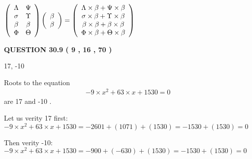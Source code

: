 \documentclass[12pt]{article}
\begin{document}
$  %
 \left( \begin{array}
 {
 c
 c
 }
 \Lambda & 
 \Psi \\ 
 \sigma & 
 \Upsilon \\ 
 \beta & 
 \beta \\ 
 \Phi & 
 \Theta
 \end{array} \right)
 \left( \begin{array}
 {
 c
 }
 \beta \\ 
 \beta
 \end{array} \right)
=
 \left( \begin{array}
 {
 c
 }
  \Lambda \times  \beta +  \Psi \times  \beta \\ 
  \sigma \times  \beta +  \Upsilon \times  \beta \\ 
  \beta \times  \beta +  \beta \times  \beta \\ 
  \Phi \times  \beta +  \Theta \times  \beta
 \end{array} \right)
$
 
 
 
 
 
\noindent{}

 
 
  
\vspace{0.2in}
  
{\textbf{\Large{QUESTION
30.9 
 (           9 ,          16 ,          70 )
}}}
  
  


 
 
\noindent{}

17,  %
-10
 
 
 
 
 
\noindent{}

Roots to the equation
\begin{eqnarray*}
-9 \times x^2  %
+  %
63
                 \times x    %
+  %
1530 =0
\end{eqnarray*}
are  %
17 and  %
-10 .
 
Let us verity  %
17 first:
$  %
-9 \times x^2  %
+  %
63
                 \times x    %
+  %
1530
  = %
-2601+( %
1071)+( %
1530)
  = %
-1530+( %
1530)
  = %
0
$
 
Then verity  %
-10:
$  %
-9 \times x^2  %
+  %
63
                 \times x    %
+  %
1530
  = %
-900+( %
-630)+( %
1530)
  = %
-1530+( %
1530)
  = %
0
$
 
\end{document}
